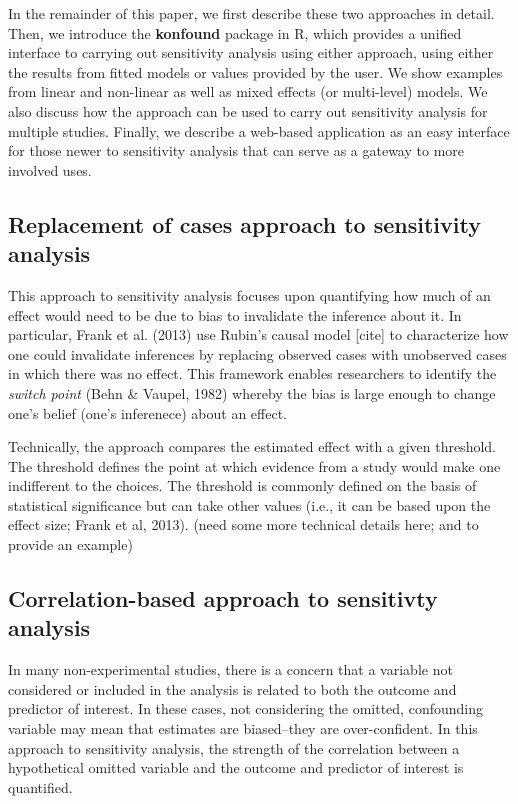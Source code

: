\documentclass[man]{apa6}
\begin{document}
In the remainder of this paper, we first describe these two approaches
in detail. Then, we introduce the \textbf{konfound} package in R, which
provides a unified interface to carrying out sensitivity analysis using
either approach, using either the results from fitted models or values
provided by the user. We show examples from linear and non-linear as
well as mixed effects (or multi-level) models. We also discuss how the
approach can be used to carry out sensitivity analysis for multiple
studies. Finally, we describe a web-based application as an easy
interface for those newer to sensitivity analysis that can serve as a
gateway to more involved uses.

\subsection{Replacement of cases approach to sensitivity
analysis}\label{replacement-of-cases-approach-to-sensitivity-analysis}

This approach to sensitivity analysis focuses upon quantifying how much
of an effect would need to be due to bias to invalidate the inference
about it. In particular, Frank et al. (2013) use Rubin's causal model
{[}cite{]} to characterize how one could invalidate inferences by
replacing observed cases with unobserved cases in which there was no
effect. This framework enables researchers to identify the \emph{switch
point} (Behn \& Vaupel, 1982) whereby the bias is large enough to change
one's belief (one's inferenece) about an effect.

Technically, the approach compares the estimated effect with a given
threshold. The threshold defines the point at which evidence from a
study would make one indifferent to the choices. The threshold is
commonly defined on the basis of statistical significance but can take
other values (i.e., it can be based upon the effect size; Frank et al,
2013). (need some more technical details here; and to provide an
example)

\subsection{Correlation-based approach to sensitivty
analysis}\label{correlation-based-approach-to-sensitivty-analysis}

In many non-experimental studies, there is a concern that a variable not
considered or included in the analysis is related to both the outcome
and predictor of interest. In these cases, not considering the omitted,
confounding variable may mean that estimates are biased--they are
over-confident. In this approach to sensitivity analysis, the strength
of the correlation between a hypothetical omitted variable and the
outcome and predictor of interest is quantified.
\end{document}
